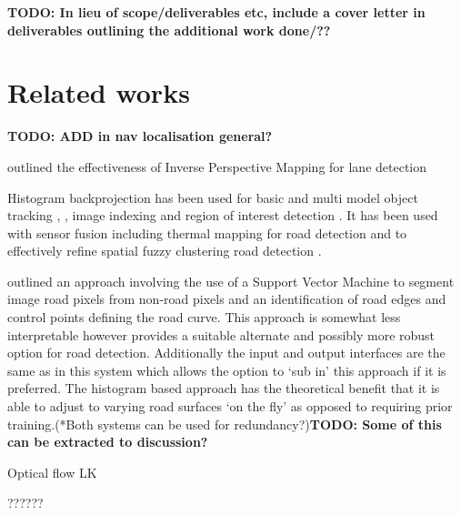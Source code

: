 \documentclass[]{aiaa-tc}%
\begin{document}
\textbf{TODO: In lieu of scope/deliverables etc, include a cover letter in deliverables outlining the additional work done/??}

\section{Related works}
\textbf{TODO: ADD in nav localisation general?}

\citet{ipmForLaneTracking} outlined the effectiveness of Inverse Perspective Mapping for lane detection 

Histogram backprojection has been used for basic \citep{histBackObjectTracking} and multi model object tracking \citep{histBackMultiObjectTrack}, \citep{histBackObjectMultiLighting} , image indexing \citep{histBackImageIndexing} and region of interest detection \citep{histBackObjectOfInterestDetection}. It has been used with sensor fusion including thermal mapping for road detection \citep{histBackThermal} and to effectively refine spatial fuzzy clustering road detection \citep{histBackRefineShadows}.

\citet{moncularLaneDetectAndTrack} outlined an approach involving the use of a Support Vector Machine to segment image road pixels from non-road pixels and an identification of road edges and control points defining the road curve. This approach is somewhat less interpretable however provides a suitable alternate and possibly more robust option for road detection. Additionally the input and output interfaces are the same as in this system which allows the option to `sub in' this approach if it is preferred. The histogram based approach has the theoretical benefit that it is able to adjust to varying road surfaces `on the fly' as opposed to requiring prior training.(*Both systems can be used for redundancy?)\textbf{TODO: Some of this can be extracted to discussion?}

Optical flow LK

??????
\end{document}
